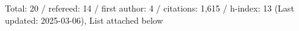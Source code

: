 Total: 20 / refereed: 14 / first author: 4 / citations: 1,615 / h-index: 13 (Last updated: 2025-03-06), List attached below